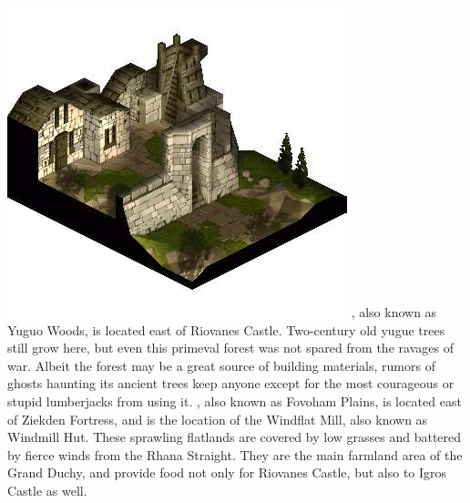 %
\clearpage
\includegraphics[width=\columnwidth]{./art/worldbook/yardrow.jpg}
\vfill
%
, also known as Yuguo Woods, is located east of Riovanes Castle.
Two-century old yugue trees still grow here, but even this primeval forest was not spared from the ravages of war. 
Albeit the forest may be a great source of building materials, rumors of ghosts haunting its ancient trees keep anyone except for the most courageous or stupid lumberjacks from using it.
, also known as Fovoham Plains, is located east of Ziekden Fortress, and is the location of the Windflat Mill, also known as Windmill Hut. 
These sprawling flatlands are covered by low grasses and battered by fierce winds from the Rhana Straight. 
They are the main farmland area of the Grand Duchy, and provide food not only for Riovanes Castle, but also to Igros Castle as well.
%
\vfill
